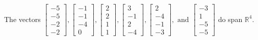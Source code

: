 \begin{exercise}
\begin{exerciseStatement}
  \end{exerciseStatement}
  \begin{exerciseAnswer}
   The vectors \(\left[\begin{array}{r}
-5 \\
-5 \\
-2 \\
-2
\end{array}\right] , \left[\begin{array}{r}
-1 \\
-1 \\
-4 \\
0
\end{array}\right] , \left[\begin{array}{r}
2 \\
2 \\
1 \\
1
\end{array}\right] , \left[\begin{array}{r}
3 \\
-1 \\
2 \\
-4
\end{array}\right] , \left[\begin{array}{r}
2 \\
-4 \\
-1 \\
-3
\end{array}\right] , \text{ and } \left[\begin{array}{r}
-3 \\
1 \\
-5 \\
-5
\end{array}\right]\) 
  	 do  
	span \(\mathbb{R}^4\).
  


  \end{exerciseAnswer}
\end{exercise}